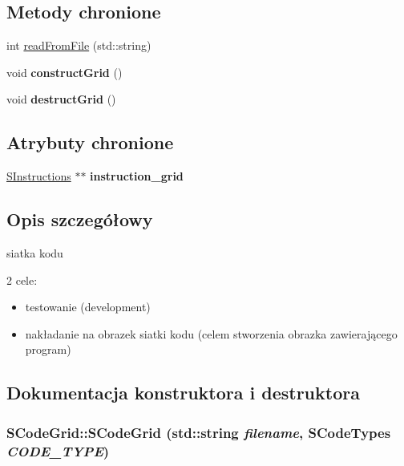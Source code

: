 \subsection*{Metody chronione}
\begin{CompactItemize}
\item 
int \hyperlink{classSCodeGrid_46ed88ad7346788efb14c40cbd836981}{readFromFile} (std::string)
\item 
\hypertarget{classSCodeGrid_f15ba156433f88a40887e5ba72d9201a}{
void \textbf{constructGrid} ()}
\label{classSCodeGrid_f15ba156433f88a40887e5ba72d9201a}

\item 
\hypertarget{classSCodeGrid_6bd4c1bf841bd09c2ffb2e019c08b4ed}{
void \textbf{destructGrid} ()}
\label{classSCodeGrid_6bd4c1bf841bd09c2ffb2e019c08b4ed}

\end{CompactItemize}
\subsection*{Atrybuty chronione}
\begin{CompactItemize}
\item 
\hypertarget{classSCodeGrid_445b4bd8cca6ddb7100afa621f5722b0}{
\hyperlink{senums_8h_b1c3fa9dccd3f8afa81e14a98d9a7d1e}{SInstructions} $\ast$$\ast$ \textbf{instruction\_\-grid}}
\label{classSCodeGrid_445b4bd8cca6ddb7100afa621f5722b0}

\end{CompactItemize}


\subsection{Opis szczegółowy}
siatka kodu 

2 cele:

\begin{itemize}
\item testowanie (development)\item nakładanie na obrazek siatki kodu (celem stworzenia obrazka zawierającego program) \end{itemize}


\subsection{Dokumentacja konstruktora i destruktora}
\hypertarget{classSCodeGrid_e430762ac9855cd60f8d5a57c46428b9}{
\subsubsection[{SCodeGrid}]{\setlength{\rightskip}{0pt plus 5cm}SCodeGrid::SCodeGrid (std::string {\em filename}, \/  {\bf SCodeTypes} {\em CODE\_\-TYPE})}}
\label{classSCodeGrid_e430762ac9855cd60f8d5a57c46428b9}


